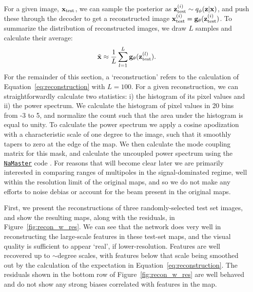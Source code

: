 \documentclass[fleqn,usenatbib]{mnras}
\begin{document}
For a given image, $\mathbf x_{\rm test}$, we can sample the posterior as $\mathbf z_{\rm test}^{(i)} \sim q_\phi(\mathbf z | \mathbf x)$, and push these through the decoder to get a reconstructed image $\mathbf x^{(i)}_{\rm test} = \mathbf g_\theta(\mathbf z^{(i)}_{\rm test})$. To summarize the distribution of reconstructed images, we draw $L$ samples and calculate their average:
\begin{equation}
\label{eq:reconstruction}
    \tilde{\mathbf x} \approx \frac{1}{L} \sum_{l=1}^{L} \mathbf g_\theta(\mathbf z_{\rm test}^{(l)}).
\end{equation}
For the remainder of this section, a `reconstruction' refers to the calculation of Equation~\ref{eq:reconstruction} with $L=100$. For a given reconstruction, we can straightforwardly calculate two statistics: i) the histogram of its pixel values and ii) the power spectrum. We calculate the histogram of pixel values in 20 bins from -3 to 5, and normalize the count such that the area under the histogram is equal to unity. To calculate the power spectrum we apply a cosine apodization with a characteristic scale of one degree to the image, such that it smoothly tapers to zero at the edge of the map. We then calculate the mode coupling matrix for this mask, and calculate the uncoupled power spectrum using the \href{https://github.com/LSSTDESC/NaMaster}{\tt NaMaster} code \citep{alonso/etal:2019}. For reasons that will become clear later we are primarily interested in comparing ranges of multipoles in the signal-dominated regime, well within the resolution limit of the original maps, and so we do not make any efforts to noise debias or account for the beam present in the original maps.

First, we present the reconstructions of three randomly-selected test set images, and show the resulting maps, along with the residuals, in Figure~\ref{fig:recon_w_res}. We can see that the network does very well in reconstructing the large-scale features in these test-set maps, and the visual quality is sufficient to appear `real', if lower-resolution. Features are well recovered up to $\sim$degree scales, with features below that scale being smoothed out by the calculation of the expectation in Equation~\ref{eq:reconstruction}. The residuals shown in the bottom row of Figure~\ref{fig:recon_w_res} are well behaved and do not show any strong biases correlated with features in the map. 
\end{document}
